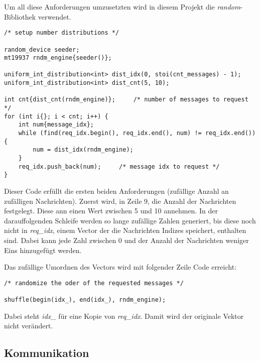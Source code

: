 \documentclass[]{article}
\begin{document}
Um all diese Anforderungen umzusetzten wird in diesem Projekt die \textit{random}-Bibliothek verwendet.

\begin{lstlisting}
/* setup number distributions */

random_device seeder;
mt19937 rndm_engine{seeder()};

uniform_int_distribution<int> dist_idx(0, stoi(cnt_messages) - 1);
uniform_int_distribution<int> dist_cnt(5, 10);

int cnt{dist_cnt(rndm_engine)};     /* number of messages to request */
for (int i{}; i < cnt; i++) {
	int num{message_idx};
	while (find(req_idx.begin(), req_idx.end(), num) != req_idx.end()) {
		num = dist_idx(rndm_engine);
	}
	req_idx.push_back(num);     /* message idx to request */
}
\end{lstlisting}

Dieser Code erfüllt die ersten beiden Anforderungen (zufällige Anzahl an zufälligen Nachrichten). Zuerst wird, in Zeile 9, die Anzahl der Nachrichten festgelegt. Diese ann einen Wert zwischen 5 und 10 annehmen. In der darauffolgenden Schleife werden so lange zufällige Zahlen generiert, bis diese noch nicht in \textit{req\_idx}, einem Vector der die Nachrichten Indizes speichert, enthalten sind. Dabei kann jede Zahl zwischen 0 und der Anzahl der Nachrichten weniger Eins hinzugefügt werden.

Das zufällige Umordnen des Vectors wird mit folgender Zeile Code erreicht:

\begin{lstlisting}
/* randomize the oder of the requested messages */

shuffle(begin(idx_), end(idx_), rndm_engine);
\end{lstlisting}

Dabei steht \textit{idx\_} für eine Kopie von \textit{req\_idx}. Damit wird der originale Vektor nicht verändert.

\subsection{Kommunikation}
\end{document}
